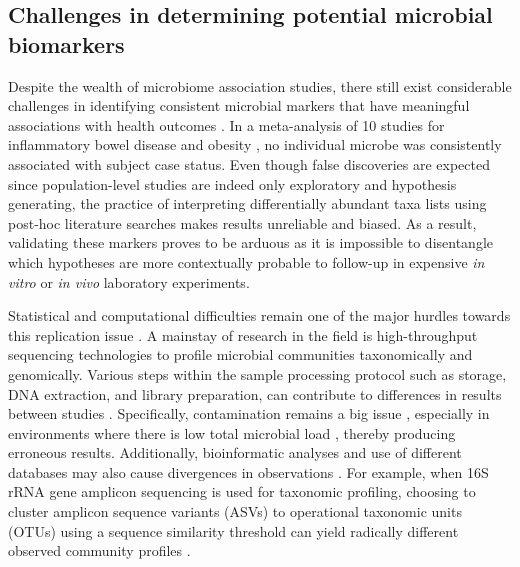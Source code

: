 \subsection{Challenges in determining potential microbial biomarkers}
Despite the wealth of microbiome association studies, there still exist considerable challenges in identifying consistent microbial markers that have meaningful associations with health outcomes \cite{duvallet2017metaanalysis}. In a meta-analysis of 10 studies for inflammatory bowel disease and obesity \cite{walters2014metaanalyses}, no individual microbe was consistently associated with subject case status. Even though false discoveries are expected since population-level studies are indeed only exploratory and hypothesis generating, the practice of interpreting differentially abundant taxa lists using post-hoc literature searches makes results unreliable and biased. As a result, validating these markers proves to be arduous as it is impossible to disentangle which hypotheses are more contextually probable to follow-up in expensive \emph{in vitro} or \emph{in vivo} laboratory experiments.  

Statistical and computational difficulties remain one of the major hurdles towards this replication issue \cite{li2015microbiome, li2019comparative}. A mainstay of research in the field is high-throughput sequencing technologies to profile microbial communities taxonomically and genomically. Various steps within the sample processing protocol such as storage, DNA extraction, and library preparation, can contribute to differences in results between studies \cite{clausen2021evaluating}. Specifically, contamination remains a big issue \cite{davis2018simple}, especially in environments where there is low total microbial load \cite{eisenhofer2019contamination}, thereby producing erroneous results. Additionally, bioinformatic analyses and use of different databases may also cause divergences in observations \cite{moossavi2020biological}. For example, when 16S rRNA gene amplicon sequencing is used for taxonomic profiling, choosing to cluster amplicon sequence variants (ASVs) to operational taxonomic units (OTUs) using a sequence similarity threshold can yield radically different observed community profiles \cite{chiarello2022ranking, moossavi2020biological}.   

